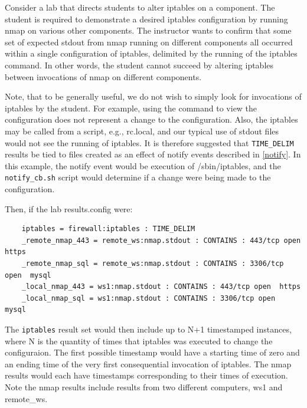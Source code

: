 \documentclass[12pt]{article}
\begin{document}
Consider a lab that directs students to alter iptables on a component.
The student is required to demonstrate a desired iptables
configuration by running nmap on various other components.  The instructor wants 
to confirm that some set of expected stdout from nmap running on different
components all occurred within a single
configuration of iptables, delimited by the running of the iptables command.  In other words,
the student cannot succeed by altering iptables between invocations of nmap on
different components.  

Note, that to be generally useful, we do not wish to simply look for invocations of iptables
by the student.
For example, using the command to view the configuration does not represent a change to
the configuration.  Also, the iptables may be called from a script, e.g., rc.local, and
our typical use of stdout files would not see the running of iptables.  It is therefore
suggested that {\tt TIME\_DELIM} results be tied to files created as an effect of 
notify events described in \ref{notify}.  In this example, the notify event would be execution
of /sbin/iptables, and the {\tt notify\_cb.sh} script would determine if a change were being
made to the configuration.

Then, if the lab results.config were:
\begin{verbatim}
    iptables = firewall:iptables : TIME_DELIM
    _remote_nmap_443 = remote_ws:nmap.stdout : CONTAINS : 443/tcp open  https
    _remote_nmap_sql = remote_ws:nmap.stdout : CONTAINS : 3306/tcp open  mysql
    _local_nmap_443 = ws1:nmap.stdout : CONTAINS : 443/tcp open  https
    _local_nmap_sql = ws1:nmap.stdout : CONTAINS : 3306/tcp open  mysql
\end{verbatim}

\noindent The {\tt iptables} result set would then include up to N+1 timestamped instances,
where N is the quantity of times that iptables was executed to change the configuraion. The first possible
timestamp would have a starting time of zero and an ending time of the very first
consequential invocation of iptables.  The nmap results would each have timestamps corresponding
to their times of execution.  Note the nmap results include results from two different
computers, ws1 and remote\_ws.
\end{document}
